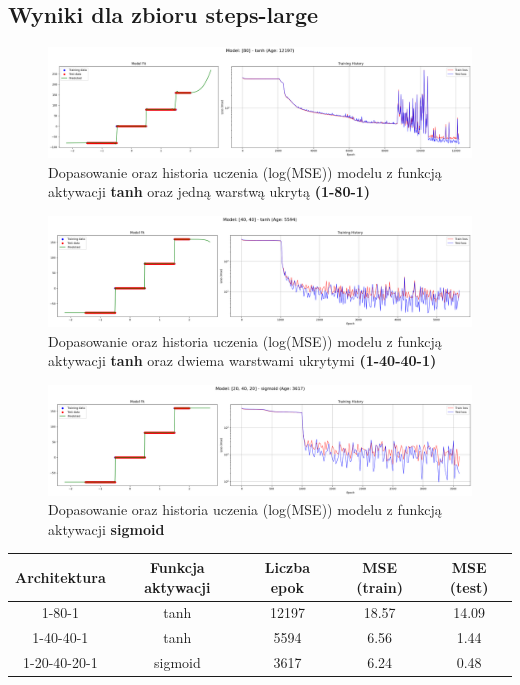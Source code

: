 \documentclass{article}
\begin{document}
\subsection*{Wyniki dla zbioru steps-large}
\begin{figure}[H]
    \centering
    \includegraphics[width=\textwidth]{img/nn5/steps-large_tanhsimple.png}
    \caption{Dopasowanie oraz historia uczenia (log(MSE)) modelu z funkcją aktywacji \textbf{tanh} oraz jedną warstwą ukrytą \textbf{(1-80-1)}}
\end{figure}
\begin{figure}[H]
    \centering
    \includegraphics[width=\textwidth]{img/nn5/steps-large_tanh.png}
    \caption{Dopasowanie oraz historia uczenia (log(MSE)) modelu z funkcją aktywacji \textbf{tanh} oraz dwiema warstwami ukrytymi \textbf{(1-40-40-1)}}
\end{figure}
\begin{figure}[H]
    \centering
    \includegraphics[width=\textwidth]{img/nn5/steps-large_sigmoid.png}
    \caption{Dopasowanie oraz historia uczenia (log(MSE)) modelu z funkcją aktywacji \textbf{sigmoid}}
\end{figure}

\begin{center}
\begin{tabular}{|c|c|c|c|c|}
    \hline
    Architektura & Funkcja aktywacji & Liczba epok & MSE (train) & MSE (test) \\
    \hline
    1-80-1 & tanh & 12197 & 18.57 & 14.09 \\
    1-40-40-1 & tanh & 5594 & 6.56 & 1.44 \\
    1-20-40-20-1 & sigmoid & 3617 & 6.24 & 0.48 \\
    \hline
\end{tabular}
\end{center}
\end{document}
